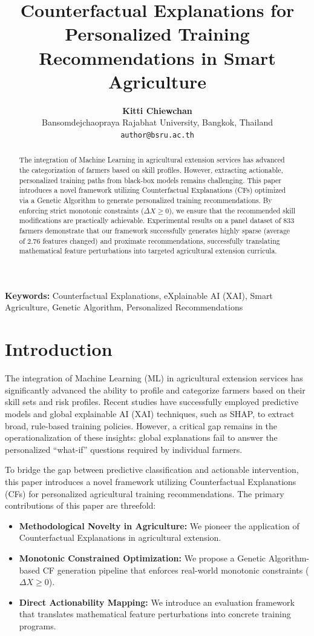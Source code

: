 \documentclass[12pt, a4paper]{article}
\title{\textbf{Counterfactual Explanations for Personalized Training Recommendations in Smart Agriculture}}
\author{
    \textbf{Kitti Chiewchan} \\
    Bansomdejchaopraya Rajabhat University, Bangkok, Thailand \\
    \texttt{author@bsru.ac.th}
}
\date{}
\begin{document}
\maketitle

\begin{abstract}
The integration of Machine Learning in agricultural extension services has advanced the categorization of farmers based on skill profiles. However, extracting actionable, personalized training paths from black-box models remains challenging. This paper introduces a novel framework utilizing Counterfactual Explanations (CFs) optimized via a Genetic Algorithm to generate personalized training recommendations. By enforcing strict monotonic constraints ($\Delta X \ge 0$), we ensure that the recommended skill modifications are practically achievable. Experimental results on a panel dataset of 833 farmers demonstrate that our framework successfully generates highly sparse (average of 2.76 features changed) and proximate recommendations, successfully translating mathematical feature perturbations into targeted agricultural extension curricula.
\end{abstract}

\vspace{0.5cm}
\noindent\textbf{Keywords:} Counterfactual Explanations, eXplainable AI (XAI), Smart Agriculture, Genetic Algorithm, Personalized Recommendations

\section{Introduction}\label{sec1}
The integration of Machine Learning (ML) in agricultural extension services has significantly advanced the ability to profile and categorize farmers based on their skill sets and risk profiles. Recent studies have successfully employed predictive models and global explainable AI (XAI) techniques, such as SHAP, to extract broad, rule-based training policies. However, a critical gap remains in the operationalization of these insights: global explanations fail to answer the personalized ``what-if'' questions required by individual farmers. 

To bridge the gap between predictive classification and actionable intervention, this paper introduces a novel framework utilizing Counterfactual Explanations (CFs) for personalized agricultural training recommendations. The primary contributions of this paper are threefold:
\begin{itemize}
    \item \textbf{Methodological Novelty in Agriculture:} We pioneer the application of Counterfactual Explanations in agricultural extension.
    \item \textbf{Monotonic Constrained Optimization:} We propose a Genetic Algorithm-based CF generation pipeline that enforces real-world monotonic constraints ($\Delta X \ge 0$).
    \item \textbf{Direct Actionability Mapping:} We introduce an evaluation framework that translates mathematical feature perturbations into concrete training programs.
\end{itemize}
\end{document}
